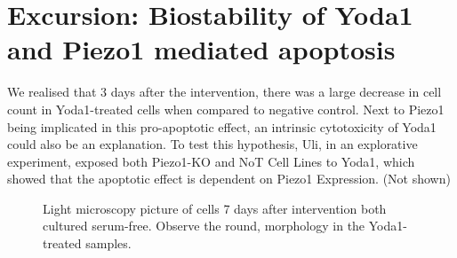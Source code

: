 \section{Excursion: Biostability of Yoda1 and Piezo1 mediated apoptosis}
\label{sec:biostability}
We realised that 3 days after the intervention, there was a large decrease in cell count in Yoda1-treated cells when compared to negative control. Next to Piezo1 being implicated in this pro-apoptotic effect, an intrinsic cytotoxicity of Yoda1 could also be an explanation. To test this hypothesis, Uli, in an explorative experiment, exposed both Piezo1-KO and NoT Cell Lines to Yoda1, which showed that the apoptotic effect is dependent on Piezo1 Expression. (Not shown)

\begin{figure}
    \centering
    
    \caption{Light microscopy picture of cells 7 days after intervention both cultured serum-free. Observe the round,  morphology in the Yoda1-treated samples.}
    \label{fig:yoda_apop}
\end{figure}
